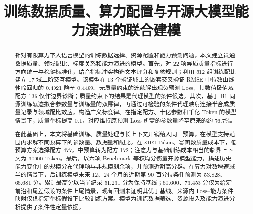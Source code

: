 \documentclass[bwprint]{gmcmthesis}
\title{训练数据质量、算力配置与开源大模型能力演进的联合建模}
\begin{document}
\maketitle

\begin{abstract}

针对有限算力下大语言模型的训练数据选择、资源配置和能力预测问题，本文建立贯通数据质量、领域配比、标度关系和能力演进的模型。首先，对 22 项异质质量指标进行方向统一与稳健标准化，结合指标冲突构造文本评分和复核规则；利用 512 组训练配比建立 17 域二阶交互模型。该模型在 13 个验证域上的嵌套交叉验证 RMSE 中位数由线性岭回归的 0.4921 降至 0.4499。无质量约束的连续解出现负预测 Loss，其数值极值及配方 136 仅作边界诊断；质量约束下的结果是代理模型的条件候选。其次，基于 B1 同源训练轨迹拟合参数量与训练量的双幂律，再通过可检验的条件代理映射连接半合成质量记录与领域配比效应，构造广义标度律。在指定配方、十亿参数和千亿 Token 的模型情景下，质量坐标提高 0.1，对应维持原预测 Loss 所需的参数量降至原来的约 76.7\%。

在此基础上，本文将基础训练、质量处理与长上下文开销纳入同一预算，在模型支持范围内求解不同预算下的参数量、数据量和配比。在 8192 Token、幂函数质量成本下，低预算方案选择配方 477，中预算转为配方 172；注意力与基础训练成本相当的临界上下文为 30000 Token。最后，以六项 Benchmark 等权均分衡量开源模型能力，描述历史能力变化中的规模分布代理项与非规模剩余项，并预测近期高分群。在算力对数增速减半的情景下，后训练模型未来 12、24 个月的近期第 90 百分位条件预测为 53.828、66.681 分。累计最高分以当前纪录 51.231 分为保持基线；60.600、73.453 分仅为给定前沿和尾差假设的条件上尾情景，现有回测未证明其优于基线。来源内 Loss--能力条件映射仅供指定坐标假设下比较训练方案。模型为训练数据筛选、资源投入及能力演进分析提供了条件性定量依据。


\end{abstract}

\pagestyle{plain}

\maketoc

\clearpage

















\end{document}
